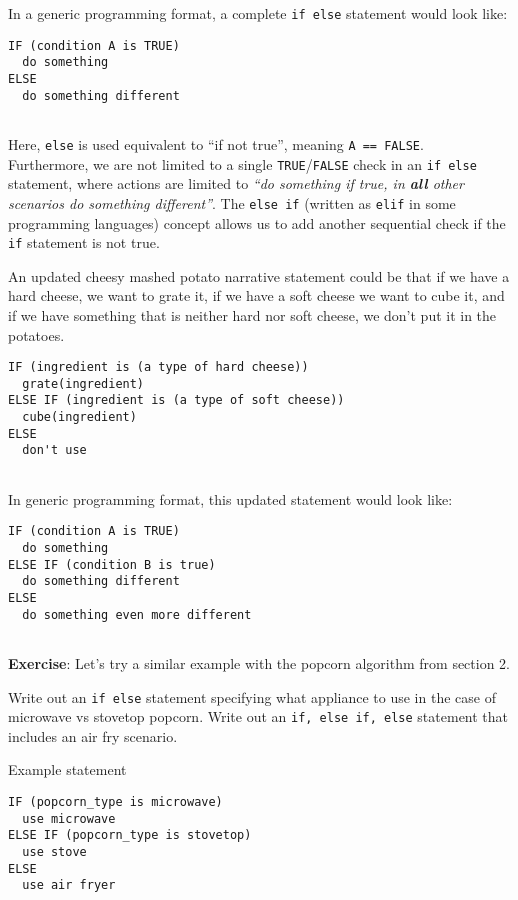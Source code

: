 \documentclass[
]{book}
\begin{document}
In a generic programming format, a complete \texttt{if\ else} statement would look like:

\begin{verbatim}
IF (condition A is TRUE)
  do something
ELSE 
  do something different
  
\end{verbatim}

Here, \texttt{else} is used equivalent to ``if not true'', meaning \texttt{A\ ==\ FALSE}.\\

Furthermore, we are not limited to a single \texttt{TRUE}/\texttt{FALSE} check in an \texttt{if\ else} statement, where actions are limited to \emph{``do something if true, in \textbf{all} other scenarios do something different''}. The \texttt{else\ if} (written as \texttt{elif} in some programming languages) concept allows us to add another sequential check if the \texttt{if} statement is not true.

An updated cheesy mashed potato narrative statement could be that if we have a hard cheese, we want to grate it, if we have a soft cheese we want to cube it, and if we have something that is neither hard nor soft cheese, we don't put it in the potatoes.

\begin{verbatim}
IF (ingredient is (a type of hard cheese))
  grate(ingredient)
ELSE IF (ingredient is (a type of soft cheese))
  cube(ingredient)
ELSE
  don't use
  
\end{verbatim}

In generic programming format, this updated statement would look like:

\begin{verbatim}
IF (condition A is TRUE)
  do something
ELSE IF (condition B is true)
  do something different
ELSE 
  do something even more different
  
\end{verbatim}

\textbf{Exercise}: Let's try a similar example with the popcorn algorithm from section 2.

Write out an \texttt{if\ else} statement specifying what appliance to use in the case of microwave vs stovetop popcorn.
Write out an \texttt{if,\ else\ if,\ else} statement that includes an air fry scenario.

Example statement

\begin{verbatim}
IF (popcorn_type is microwave)
  use microwave
ELSE IF (popcorn_type is stovetop)
  use stove
ELSE 
  use air fryer
\end{verbatim}
\end{document}
